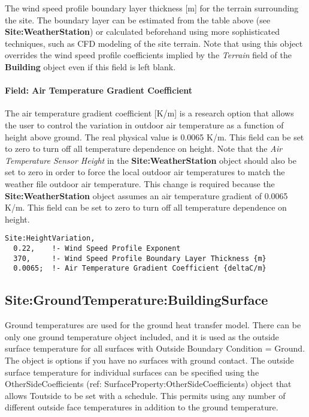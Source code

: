 The wind speed profile boundary layer thickness {[}m{]} for the terrain surrounding the site. The boundary layer can be estimated from the table above (see \textbf{Site:WeatherStation}) or calculated beforehand using more sophisticated techniques, such as CFD modeling of the site terrain. Note that using this object overrides the wind speed profile coefficients implied by the \emph{Terrain} field of the \textbf{Building} object even if this field is left blank.

\paragraph{Field: Air Temperature Gradient Coefficient}\label{field-air-temperature-gradient-coefficient}

The air temperature gradient coefficient {[}K/m{]} is a research option that allows the user to control the variation in outdoor air temperature as a function of height above ground. The real physical value is 0.0065 K/m. This field can be set to zero to turn off all temperature dependence on height. Note that the \emph{Air Temperature Sensor Height} in the \textbf{Site:WeatherStation} object should also be set to zero in order to force the local outdoor air temperatures to match the weather file outdoor air temperature. This change is required because the \textbf{Site:WeatherStation} object assumes an air temperature gradient of 0.0065 K/m. This field can be set to zero to turn off all temperature dependence on height.

\begin{lstlisting}
Site:HeightVariation,
  0.22,    !- Wind Speed Profile Exponent
  370,     !- Wind Speed Profile Boundary Layer Thickness {m}
  0.0065;  !- Air Temperature Gradient Coefficient {deltaC/m}
\end{lstlisting}

\subsection{Site:GroundTemperature:BuildingSurface}\label{sitegroundtemperaturebuildingsurface}

Ground temperatures are used for the ground heat transfer model. There can be only one ground temperature object included, and it is used as the outside surface temperature for all surfaces with Outside Boundary Condition = Ground. The object is options if you have no surfaces with ground contact. The outside surface temperature for individual surfaces can be specified using the OtherSideCoefficients (ref: SurfaceProperty:OtherSideCoefficients) object that allows Toutside to be set with a schedule. This permits using any number of different outside face temperatures in addition to the ground temperature.

